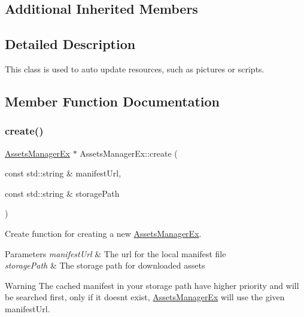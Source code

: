 \subsection*{Additional Inherited Members}


\subsection{Detailed Description}
This class is used to auto update resources, such as pictures or scripts. 

\subsection{Member Function Documentation}
\mbox{\label{classAssetsManagerEx_a12c15aa87bf72150103ec0adf9720d6d}} 
\subsubsection{\texorpdfstring{create()}{create()}\hspace{0.1cm}{\footnotesize\ttfamily [1/2]}}
{\footnotesize\ttfamily \hyperlink{classAssetsManagerEx}{Assets\+Manager\+Ex} $\ast$ Assets\+Manager\+Ex\+::create (\begin{DoxyParamCaption}\item[{const std\+::string \&}]{manifest\+Url,  }\item[{const std\+::string \&}]{storage\+Path }\end{DoxyParamCaption})\hspace{0.3cm}{\ttfamily [static]}}



Create function for creating a new \hyperlink{classAssetsManagerEx}{Assets\+Manager\+Ex}. 


\begin{DoxyParams}{Parameters}
{\em manifest\+Url} & The url for the local manifest file \\
\hline
{\em storage\+Path} & The storage path for downloaded assets \\
\hline
\end{DoxyParams}
\begin{DoxyWarning}{Warning}
The cached manifest in your storage path have higher priority and will be searched first, only if it doesn\textquotesingle{}t exist, \hyperlink{classAssetsManagerEx}{Assets\+Manager\+Ex} will use the given manifest\+Url. 
\end{DoxyWarning}
\mbox{\label{classAssetsManagerEx_a87c4409b1ddaaffbeca620a6333b676f}} 
